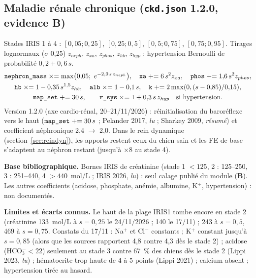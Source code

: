 \documentclass[10pt,a4paper]{article}
\newcommand{\cmd}[1]{\texttt{#1}}
\newcommand{\vp}[1]{\text{\texttt{\detokenize{#1}}}}
\newcommand{\evB}{\textcolor{green!45!black}{\textbf{B}}}
\newcommand{\acc}[1]{\textsl{#1}}
\newcommand{\limite}[1]{\par\textbf{Limites et écarts connus.} #1}
\newcommand{\sources}[1]{\par\textbf{Base bibliographique.} #1}
\begin{document}
\subsection{Maladie rénale chronique (\cmd{ckd.json} 1.2.0, evidence B)}\label{sec:ckd}
Stades IRIS 1 à 4 : $[0{,}05; 0{,}25]$, $[0{,}25; 0{,}5]$, $[0{,}5; 0{,}75]$, $[0{,}75; 0{,}95]$. Tirages lognormaux ($\sigma$ 0,25) $z_{neph}$, $z_{xa}$, $z_{phos}$, $z_{hb}$, $z_{hyp}$ ; hypertension Bernoulli de probabilité $0{,}2 + 0{,}6\,s$.
\begin{gather}
\vp{nephron_mass} \mathrel{\times}= \max\bigl(0{,}05;\ e^{-2{,}0\,s\,z_{neph}}\bigr),\quad \vp{xa} \mathrel{+}= 6\,s^2 z_{xa},\quad \vp{phos} \mathrel{+}= 1{,}6\,s^2 z_{phos},\\
\vp{hb} \mathrel{\times}= 1 - 0{,}35\,s^{1{,}5} z_{hb},\quad \vp{alb} \mathrel{\times}= 1 - 0{,}1\,s,\quad \vp{k} \mathrel{+}= 2\max(0, (s - 0{,}85)/0{,}15),\\
\vp{map_set} \mathrel{+}= 30\,s,\qquad \vp{r_sys} \mathrel{\times}= 1 + 0{,}3\,s\,z_{hyp}\quad\text{si hypertension}.
\end{gather}
Version 1.2.0 (axe cardio-rénal, 20--21/11/2026) : réinitialisation du baroréflexe vers le haut ($\vp{map_set} \mathrel{+}= 30\,s$ ; Pelander 2017, \acc{lu} ; Sharkey 2009, \acc{résumé}) et coefficient néphronique 2,4 $\to$ 2,0. Dans le rein dynamique (section~\ref{sec:reindyn}), les apports restent ceux du chien sain et les FE de base s'adaptent au néphron restant (jusqu'à $\times 8$ au stade 4).
\sources{Bornes IRIS de créatinine (stade 1 $< 125$, 2 : 125--250, 3 : 251--440, 4 $> 440$~\textmu mol/L ; IRIS 2026, \acc{lu}) : seul calage publié du module (\evB{}). Les autres coefficients (acidose, phosphate, anémie, albumine, K$^+$, hypertension) : non documentés.}
\limite{Le haut de la plage IRIS1 tombe encore en stade 2 (créatinine 133~\textmu mol/L à $s = 0{,}25$ le 24/11/2026 ; 140 le 17/11) ; 243 à $s = 0{,}5$, 469 à $s = 0{,}75$. Constats du 17/11 : Na$^+$ et Cl$^-$ constants ; K$^+$ constant jusqu'à $s = 0{,}85$ (alors que les sources rapportent 4,8 contre 4,3 dès le stade 2) ; acidose (HCO$_3^- < 22$) seulement au stade 3 contre 67~\% des chiens dès le stade 2 (Lippi 2023, \acc{lu}) ; hématocrite trop haute de 4 à 5 points (Lippi 2021) ; calcium absent ; hypertension tirée au hasard.}
\end{document}
